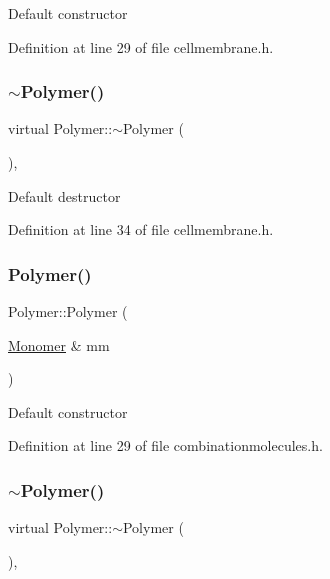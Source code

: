 Default constructor 

Definition at line 29 of file cellmembrane.\+h.

\mbox{\label{class_polymer_aac2b3983f375a5691c7d5ca1a79594d5}} 
\subsubsection{\texorpdfstring{$\sim$\+Polymer()}{~Polymer()}\hspace{0.1cm}{\footnotesize\ttfamily [2/11]}}
{\footnotesize\ttfamily virtual Polymer\+::$\sim$\+Polymer (\begin{DoxyParamCaption}{ }\end{DoxyParamCaption})\hspace{0.3cm}{\ttfamily [inline]}, {\ttfamily [virtual]}}

Default destructor 

Definition at line 34 of file cellmembrane.\+h.

\mbox{\label{class_polymer_ae77454a3908652e4df6a26b9cac509a5}} 
\subsubsection{\texorpdfstring{Polymer()}{Polymer()}\hspace{0.1cm}{\footnotesize\ttfamily [3/14]}}
{\footnotesize\ttfamily Polymer\+::\+Polymer (\begin{DoxyParamCaption}\item[{\hyperlink{class_monomer}{Monomer} \&}]{mm }\end{DoxyParamCaption})\hspace{0.3cm}{\ttfamily [inline]}}

Default constructor 

Definition at line 29 of file combinationmolecules.\+h.

\mbox{\label{class_polymer_aac2b3983f375a5691c7d5ca1a79594d5}} 
\subsubsection{\texorpdfstring{$\sim$\+Polymer()}{~Polymer()}\hspace{0.1cm}{\footnotesize\ttfamily [3/11]}}
{\footnotesize\ttfamily virtual Polymer\+::$\sim$\+Polymer (\begin{DoxyParamCaption}{ }\end{DoxyParamCaption})\hspace{0.3cm}{\ttfamily [inline]}, {\ttfamily [virtual]}}


